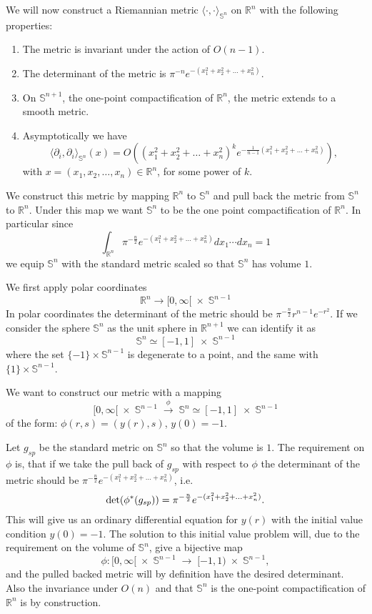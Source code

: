 \documentclass[letterpaper,11pt]{article}
\newcommand{\R}{\mathbb{ R}}
\begin{document}
We will now construct a Riemannian metric $\langle \cdot , \cdot \rangle_{\mathbb{S}^{n}} $ on $\mathbb{R}^n$ with the following properties:
\begin{enumerate}
    \item The metric is invariant under the action of $O(n-1)$.
    \item The determinant of the metric is $\pi^{-n}e^{-(x_1^2+x_2^2+\ldots +x_n^2)}$.
    \item On $\mathbb{S}^{n+1}$, the one-point compactification of $\mathbb{R}^n$, the metric extends to a smooth metric.  
    \item Asymptotically we have 
    $$ \langle \partial_i,\partial_i  \rangle_{\mathbb{S}^{n}} (x) = O( (x_1^2+x_2^2+\ldots +x_n^2)^ke^{-\frac{1}{n-1}(x_1^2+x_2^2+\ldots +x_n^2)}),  $$
    with $x=(x_1,x_2,\ldots ,x_n)\in \mathbb{R}^n$, for some power of $k$.
\end{enumerate}

We construct this metric by mapping $\R^n$ to $\mathbb{S}^n$ and pull back the metric from $\mathbb{S}^n$ to $\R^n$. Under this map we want $\mathbb{S}^n$ to be the one point compactification of $\R^n$. In particular since
$$ \int_{\R^n} \pi^{-\frac{n}{2}}e^{-(x_1^2+x_2^2+\ldots +x_n^2)} dx_1\cdots dx_n =1$$
we equip $\mathbb{S}^n$ with the standard metric scaled so that $\mathbb{S}^n$  has volume $1$.


We first apply polar coordinates 
$$
\mathbb{R}^n\rightarrow [ 0,\infty[ \;\times\; \mathbb{S}^{n-1}
$$
In polar coordinates the determinant of the metric should be $\pi^{-\frac{n}{2}} r^{n-1} e^{-r^2}$.
If we consider the sphere $\mathbb{S}^n$ as the unit sphere in $\R^{n+1}$ we can identify it as 
$$ \mathbb{S}^{n} \simeq [-1,1] \;\times\; \mathbb{S}^{n-1}  $$
where the set $\{-1\}\times \mathbb{S}^{n-1} $ is degenerate to a point, and the same with  $\{1\}\times \mathbb{S}^{n-1} $.

We want to construct our metric with a mapping  
$$
[ 0,\infty[\; \times\; \mathbb{S}^{n-1} \;\stackrel{\phi}{\longrightarrow}\; \mathbb{S}^{n} \simeq [-1,1] \;\times\; \mathbb{S}^{n-1}
$$
of the form: $\phi(r,s)= (y(r),s)$, $y(0)=-1$. 

Let $g_{sp}$ be the standard metric on $\mathbb{S}^n$ so that the volume is $1$. The requirement on $\phi$ is, that if we take the pull back of $g_{sp}$ with respect to $\phi$ the determinant of the metric should be  $\pi^{-\frac{n}{2}}e^{-(x_1^2+x_2^2+\ldots +x_n^2)}$, i.e. 
$$\hbox{det} (\phi^*(g_{sp}))=\pi^{-\frac{n}{2}}e^{-(x_1^2+x_2^2+\ldots +x_n^2)}. $$
This will give us an ordinary differential equation for $y(r)$ with the initial value condition $y(0)=-1$. The solution to this initial value problem  will, due to the requirement on the volume of $\mathbb{S}^n$, give a bijective map 
$$\phi : [ 0,\infty[\; \times\; \mathbb{S}^{n-1} \;\longrightarrow\;  [-1,1) \;\times\; \mathbb{S}^{n-1} ,$$
and the pulled backed metric will by definition have the desired determinant. Also the invariance under $O(n)$ and that $\mathbb{S}^n$ is the one-point compactification of $\R^n$ is by construction. 
\\
\end{document}
